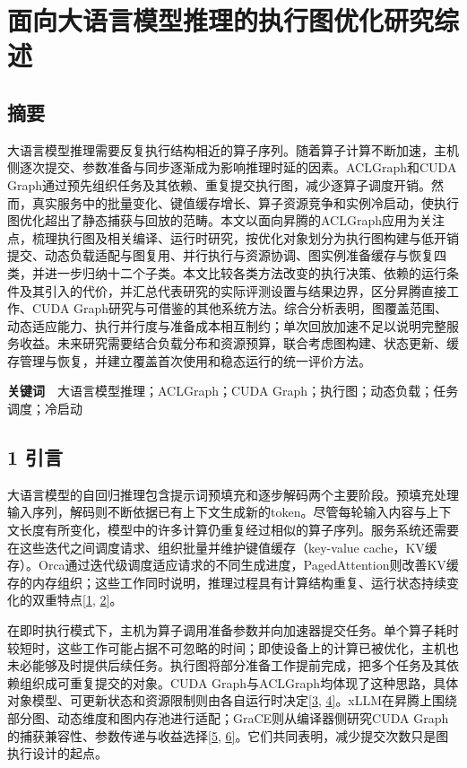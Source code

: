 \documentclass[UTF8,11pt,fontset=windows]{ctexart}
\begin{document}
\hypertarget{paper-title}{%
\section{面向大语言模型推理的执行图优化研究综述}\label{paper-title}}

\hypertarget{abstract}{%
\subsection{摘要}\label{abstract}}

大语言模型推理需要反复执行结构相近的算子序列。随着算子计算不断加速，主机侧逐次提交、参数准备与同步逐渐成为影响推理时延的因素。ACLGraph和CUDA Graph通过预先组织任务及其依赖、重复提交执行图，减少逐算子调度开销。然而，真实服务中的批量变化、键值缓存增长、算子资源竞争和实例冷启动，使执行图优化超出了静态捕获与回放的范畴。本文以面向昇腾的ACLGraph应用为关注点，梳理执行图及相关编译、运行时研究，按优化对象划分为执行图构建与低开销提交、动态负载适配与图复用、并行执行与资源协调、图实例准备缓存与恢复四类，并进一步归纳十二个子类。本文比较各类方法改变的执行决策、依赖的运行条件及其引入的代价，并汇总代表研究的实际评测设置与结果边界，区分昇腾直接工作、CUDA Graph研究与可借鉴的其他系统方法。综合分析表明，图覆盖范围、动态适应能力、执行并行度与准备成本相互制约；单次回放加速不足以说明完整服务收益。未来研究需要结合负载分布和资源预算，联合考虑图构建、状态更新、缓存管理与恢复，并建立覆盖首次使用和稳态运行的统一评价方法。

\textbf{关键词}　大语言模型推理；ACLGraph；CUDA Graph；执行图；动态负载；任务调度；冷启动

\hypertarget{section-1}{%
\subsection{1 引言}\label{section-1}}

大语言模型的自回归推理包含提示词预填充和逐步解码两个主要阶段。预填充处理输入序列，解码则不断依据已有上下文生成新的token。尽管每轮输入内容与上下文长度有所变化，模型中的许多计算仍重复经过相似的算子序列。服务系统还需要在这些迭代之间调度请求、组织批量并维护键值缓存（key-value cache，KV缓存）。Orca通过迭代级调度适应请求的不同生成进度，PagedAttention则改善KV缓存的内存组织；这些工作同时说明，推理过程具有计算结构重复、运行状态持续变化的双重特点\protect\hyperlink{ref-1}{{[}1}, \protect\hyperlink{ref-2}{2{]}}。

在即时执行模式下，主机为算子调用准备参数并向加速器提交任务。单个算子耗时较短时，这些工作可能占据不可忽略的时间；即使设备上的计算已被优化，主机也未必能够及时提供后续任务。执行图将部分准备工作提前完成，把多个任务及其依赖组织成可重复提交的对象。CUDA Graph与ACLGraph均体现了这种思路，具体对象模型、可更新状态和资源限制则由各自运行时决定\protect\hyperlink{ref-3}{{[}3}, \protect\hyperlink{ref-4}{4{]}}。xLLM在昇腾上围绕部分图、动态维度和图内存池进行适配；GraCE则从编译器侧研究CUDA Graph的捕获兼容性、参数传递与收益选择\protect\hyperlink{ref-5}{{[}5}, \protect\hyperlink{ref-6}{6{]}}。它们共同表明，减少提交次数只是图执行设计的起点。
\end{document}

